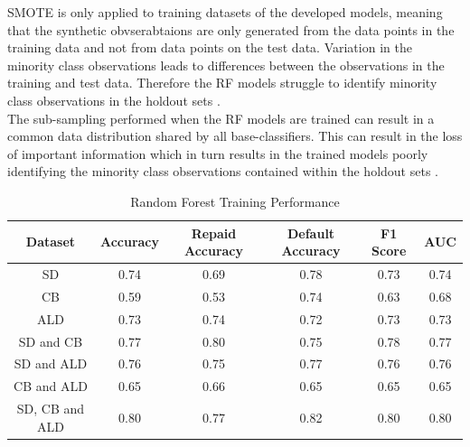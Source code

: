 SMOTE is only applied to training datasets of the developed models, meaning that the synthetic obvserabtaions are only generated from the data points in the training data and not from data points on the test data. Variation in the minority class observations leads to differences between the observations in the training and test data. Therefore the RF models struggle to identify minority class observations in the holdout sets \parencite{NNShen}. \\

The sub-sampling performed when the RF models are trained can result in a common data distribution shared by all base-classifiers. This can result in the loss of important information which in turn results in the trained models poorly identifying the minority class observations contained within the holdout sets \parencite{Minority}. \\

\vspace{10pt}

\begin{table}[H]
\begin{center}
\begin{tabular}{|c|c|c|c|c|c|} 
\hline
\multicolumn{1}{|c|}{Dataset}
&\multicolumn{1}{|c|}{Accuracy}
&\multicolumn{1}{|c|}{Repaid Accuracy}
&\multicolumn{1}{|c|}{Default Accuracy}
&\multicolumn{1}{|c|}{F1 Score}
&\multicolumn{1}{|c|}{AUC}\\
\hline
SD & 0.74 & 0.69 & 0.78 & 0.73 & 0.74    \\
\hline
CB & 0.59 & 0.53 & 0.74 & 0.63 & 0.68    \\
\hline
ALD & 0.73 & 0.74 & 0.72 & 0.73 & 0.73    \\
\hline
SD and CB & 0.77 & 0.80 & 0.75 & 0.78 & 0.77    \\
\hline
SD and ALD & 0.76 & 0.75 & 0.77 & 0.76 & 0.76    \\
\hline
CB and ALD & 0.65 & 0.66 & 0.65 & 0.65 & 0.65    \\
\hline
SD, CB and ALD & 0.80 & 0.77 & 0.82 & 0.80 & 0.80    \\
\hline
\end{tabular}
\end{center}
\caption{Random Forest Training Performance}
\label{table:rf training}
\end{table}

\vspace{10pt}

